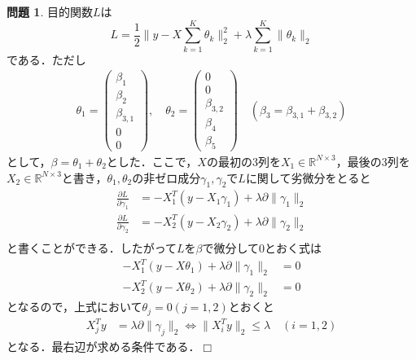 \documentclass{jsarticle}
\theoremstyle{definition}
\newtheorem{Ex}{問題}
\theoremstyle{mystyle} %
\def\qed{\hfill$\Box$}
\begin{document}
\begin{Ex}
目的関数$L$は
$$L=\frac{1}{2}\|y-X\sum_{k=1}^K\theta_k\|_2^2 +\lambda\sum_{k=1}^K\|\theta_k\|_2$$
である．ただし
\begin{align*}
  \theta_1=\left(\begin{array}{c}
    \beta_1\\
    \beta_2\\
    \beta_{3,1}\\
    0\\
    0
  \end{array}\right),\quad \theta_2=\left(\begin{array}{c}
    0\\
    0\\
    \beta_{3,2}\\
    \beta_4\\
    \beta_5
  \end{array}\right)\quad (\beta_3=\beta_{3,1}+\beta_{3,2})
\end{align*}
として，$\beta=\theta_1+\theta_2$とした．ここで，$X$の最初の3列を$X_1\in\mathbb{R}^{N\times 3}$，最後の3列を$X_2\in \mathbb{R}^{N\times 3}$と書き，$\theta_1,\theta_2$の非ゼロ成分$\gamma_1,\gamma_2$で$L$に関して劣微分をとると
\begin{align*}
  \frac{\partial L}{\partial \gamma_1}&=-X_1^T(y-X_1\gamma_1)+\lambda\partial\|\gamma_1\|_2\\
  \frac{\partial L}{\partial \gamma_2}&=-X_2^T(y-X_2\gamma_2)+\lambda\partial\|\gamma_2\|_2\\
\end{align*}
と書くことができる．したがって$L$を$\beta$で微分して$0$とおく式は
\begin{align*}
  -X_1^T(y-X\theta_1)+\lambda\partial\|\gamma_1\|_2&=0\\
  -X_2^T(y-X\theta_2)+\lambda\partial\|\gamma_2\|_2&=0
\end{align*}
となるので，上式において$\theta_j=0(j=1,2)$とおくと
\begin{align*}
  X_j^Ty &=\lambda\partial\|\gamma_j\|_2\Leftrightarrow \|X_i^Ty\|_2\leq \lambda\quad(i=1,2)
\end{align*}
となる．最右辺が求める条件である．\qed\\
\end{Ex}
\end{document}
